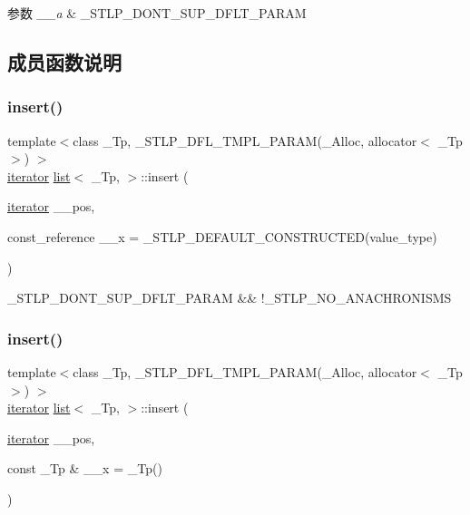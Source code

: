 \begin{DoxyParams}{参数}
{\em \+\_\+\+\_\+a} & \+\_\+\+S\+T\+L\+P\+\_\+\+D\+O\+N\+T\+\_\+\+S\+U\+P\+\_\+\+D\+F\+L\+T\+\_\+\+P\+A\+R\+AM \\
\hline
\end{DoxyParams}


\subsection{成员函数说明}
\mbox{\label{classlist_a7582d74b4ac5f51c3a5e585ca495cc0a}} 
\subsubsection{\texorpdfstring{insert()}{insert()}\hspace{0.1cm}{\footnotesize\ttfamily [1/3]}}
{\footnotesize\ttfamily template$<$class \+\_\+\+Tp, \+\_\+\+S\+T\+L\+P\+\_\+\+D\+F\+L\+\_\+\+T\+M\+P\+L\+\_\+\+P\+A\+R\+A\+M(\+\_\+\+Alloc, allocator$<$ \+\_\+\+Tp $>$) $>$ \\
\hyperlink{structiterator}{iterator} \hyperlink{classlist}{list}$<$ \+\_\+\+Tp, $>$\+::insert (\begin{DoxyParamCaption}\item[{\hyperlink{structiterator}{iterator}}]{\+\_\+\+\_\+pos,  }\item[{const\+\_\+reference}]{\+\_\+\+\_\+x = {\ttfamily \+\_\+STLP\+\_\+DEFAULT\+\_\+CONSTRUCTED(value\+\_\+type)} }\end{DoxyParamCaption})\hspace{0.3cm}{\ttfamily [inline]}}

\+\_\+\+S\+T\+L\+P\+\_\+\+D\+O\+N\+T\+\_\+\+S\+U\+P\+\_\+\+D\+F\+L\+T\+\_\+\+P\+A\+R\+AM \&\& !\+\_\+\+S\+T\+L\+P\+\_\+\+N\+O\+\_\+\+A\+N\+A\+C\+H\+R\+O\+N\+I\+S\+MS \mbox{\label{classlist_a3352f72c4bf2bef4a8c60f09cfe94aea}} 
\subsubsection{\texorpdfstring{insert()}{insert()}\hspace{0.1cm}{\footnotesize\ttfamily [2/3]}}
{\footnotesize\ttfamily template$<$class \+\_\+\+Tp, \+\_\+\+S\+T\+L\+P\+\_\+\+D\+F\+L\+\_\+\+T\+M\+P\+L\+\_\+\+P\+A\+R\+A\+M(\+\_\+\+Alloc, allocator$<$ \+\_\+\+Tp $>$) $>$ \\
\hyperlink{structiterator}{iterator} \hyperlink{classlist}{list}$<$ \+\_\+\+Tp, $>$\+::insert (\begin{DoxyParamCaption}\item[{\hyperlink{structiterator}{iterator}}]{\+\_\+\+\_\+pos,  }\item[{const \+\_\+\+Tp \&}]{\+\_\+\+\_\+x = {\ttfamily \+\_\+Tp()} }\end{DoxyParamCaption})\hspace{0.3cm}{\ttfamily [inline]}}


